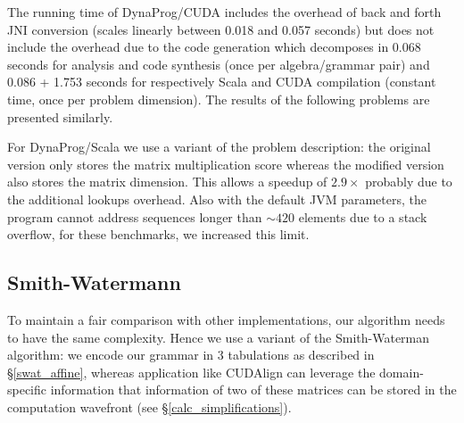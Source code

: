 The running time of DynaProg/CUDA includes the overhead of back and forth JNI conversion (scales linearly between 0.018 and 0.057 seconds) but does not include the overhead due to the code generation which decomposes in 0.068 seconds for analysis and code synthesis (once per algebra/grammar pair) and 0.086 + 1.753 seconds for respectively Scala and CUDA compilation (constant time, once per problem dimension). The results of the following problems are presented similarly.

For DynaProg/Scala we use a variant of the problem description: the original version only stores the matrix multiplication score whereas the modified version also stores the matrix dimension. This allows a speedup of $2.9\times$ probably due to the additional lookups overhead. Also with the default JVM parameters, the program cannot address sequences longer than $\sim 420$ elements due to a stack overflow, for these benchmarks, we increased this limit.

\subsection{Smith-Watermann}
To maintain a fair comparison with other implementations, our algorithm needs to have the same complexity. Hence we use a variant of the Smith-Waterman algorithm: we encode our grammar in 3 tabulations as described in \S\ref{swat_affine}, whereas application like CUDAlign can leverage the domain-specific information that information of two of these matrices can be stored in the computation wavefront (see \S\ref{calc_simplifications}).

